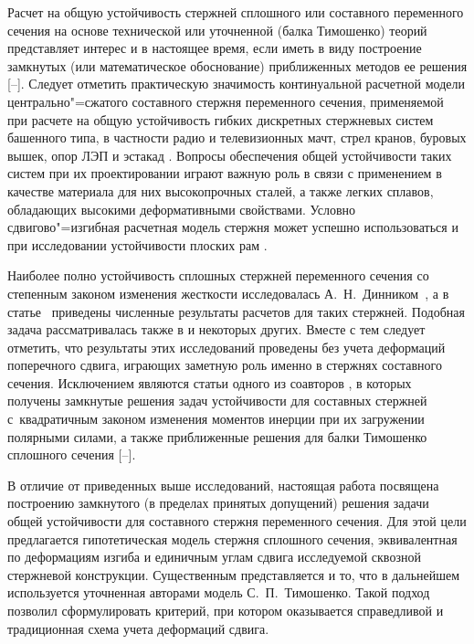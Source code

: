 

\date{17/IX/2014} %

\makerutitle


Расчет на общую устойчивость стержней сплошного или составного
переменного сечения на основе технической или уточненной (балка
Тимошенко) теорий представляет интерес и в настоящее время, если
иметь в виду построение замкнутых (или математическое обоснование)
приближенных методов ее решения
[--]. Следует отметить %
практическую значимость континуальной расчетной модели
центрально"=сжатого составного стержня переменного сечения,
применяемой при расчете на общую устойчивость гибких дискретных
стержневых систем башенного типа, в частности радио и
телевизионных мачт, стрел кранов, буровых вышек, опор ЛЭП и
эстакад \cite{senit:bib5,senit:bib12}. 
Вопросы обеспечения общей
устойчивости таких систем при их проектировании играют важную роль
в связи с применением в качестве материала для них высокопрочных
сталей, а также легких сплавов, обладающих высокими деформативными
свойствами. Условно сдвигово"=изгибная расчетная модель стержня
может успешно использоваться и при исследовании устойчивости
плоских рам \cite{senit:bib13}.

Наиболее полно устойчивость сплошных стержней переменного сечения со степенным законом изменения жесткости исследовалась А.~Н.~Динником~\cite{senit:bib1}, а в статье~\cite{senit:bib4} приведены численные результаты расчетов для таких стержней.
Подобная задача рассматривалась также в \cite{senit:bib2,senit:bib3} и некоторых других.
Вместе с тем следует отметить, что результаты этих исследований проведены без учета деформаций поперечного сдвига, играющих заметную роль именно в стержнях составного сечения. 
Исключением являются статьи одного из соавторов \cite{senit:bib5,senit:bib12,senit:bib17}, в которых получены замкнутые решения задач устойчивости для составных стержней с~квадратичным законом изменения моментов инерции при их загружении полярными силами, а также приближенные решения для балки Тимошенко сплошного сечения [--].

В отличие от приведенных выше исследований, настоящая работа посвящена построению замкнутого (в пределах принятых допущений) решения задачи общей устойчивости для составного стержня переменного сечения. Для этой цели предлагается гипотетическая модель стержня сплошного сечения, эквивалентная по деформациям изгиба и единичным углам сдвига исследуемой сквозной стержневой конструкции. 
Существенным представляется и то, что в дальнейшем используется уточненная авторами модель С.~П.~Тимошенко. 
Такой подход позволил сформулировать критерий, при котором оказывается справедливой и традиционная схема учета деформаций сдвига.

